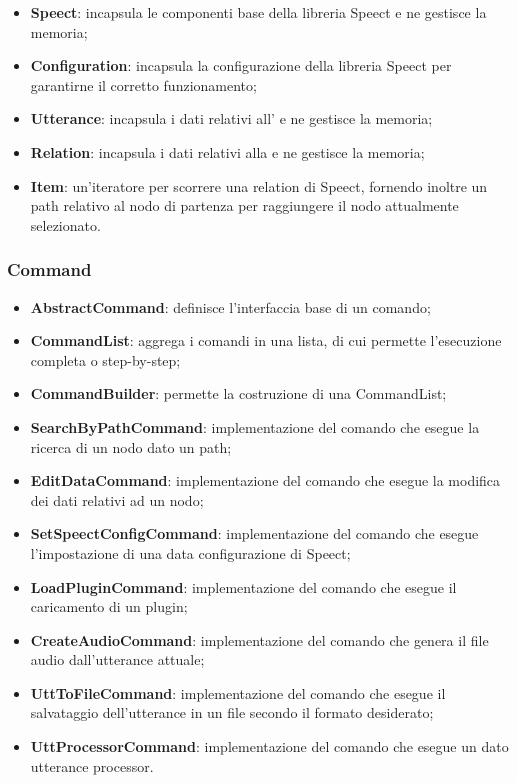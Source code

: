 \documentclass[openany,12pt,a4paper]{report}
\begin{document}
\begin{itemize}
	\item \textbf{Speect}: incapsula le componenti base della libreria Speect e ne gestisce la memoria;
	\item \textbf{Configuration}: incapsula la configurazione della libreria Speect per garantirne il corretto funzionamento;
	\item \textbf{Utterance}: incapsula i dati relativi all' e ne gestisce la memoria;
	\item \textbf{Relation}: incapsula i dati relativi alla  e ne gestisce la memoria;
	\item \textbf{Item}: un'iteratore per scorrere una relation di Speect, fornendo inoltre un path relativo al nodo di partenza per raggiungere il nodo attualmente selezionato. 
\end{itemize}

\subsubsection{Command}

\begin{itemize}
	\item \textbf{AbstractCommand}: definisce l'interfaccia base di un comando;
	\item \textbf{CommandList}: aggrega i comandi in una lista, di cui permette l'esecuzione completa o step-by-step;
	\item \textbf{CommandBuilder}: permette la costruzione di una CommandList;
	\item \textbf{SearchByPathCommand}: implementazione del comando che esegue la ricerca di un nodo dato un path;
	\item \textbf{EditDataCommand}: implementazione del comando che esegue la modifica dei dati relativi ad un nodo;
	\item \textbf{SetSpeectConfigCommand}: implementazione del comando che esegue l'impostazione di una data configurazione di Speect;
	\item \textbf{LoadPluginCommand}: implementazione del comando che esegue il caricamento di un plugin;
	\item \textbf{CreateAudioCommand}: implementazione del comando che genera il file audio dall'utterance attuale;
	\item \textbf{UttToFileCommand}: implementazione del comando che esegue il salvataggio dell'utterance in un file secondo il formato desiderato;
	\item \textbf{UttProcessorCommand}: implementazione del comando che esegue un dato utterance processor.
\end{itemize}
\end{document}
